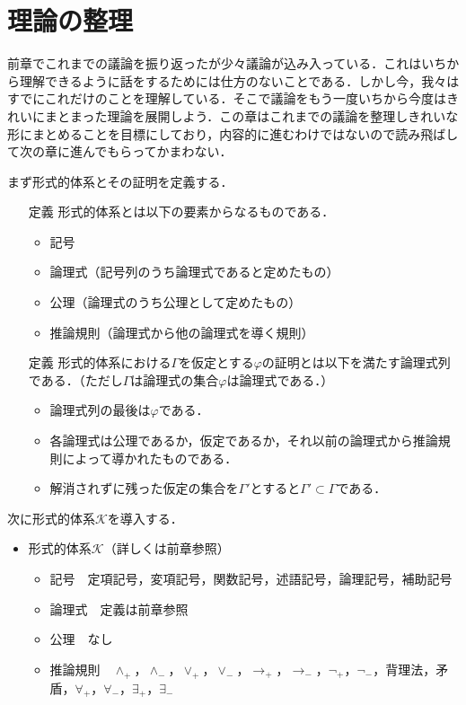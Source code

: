 \documentclass[10pt,b5paper,papersize,dvipdfmx]{jsbook}
\begin{document}
\section{理論の整理}
前章でこれまでの議論を振り返ったが少々議論が込み入っている．これはいちから理解できるように話をするためには仕方のないことである．しかし今，我々はすでにこれだけのことを理解している．そこで議論をもう一度いちから今度はきれいにまとまった理論を展開しよう．この章はこれまでの議論を整理しきれいな形にまとめることを目標にしており，内容的に進むわけではないので読み飛ばして次の章に進んでもらってかまわない．\par
まず形式的体系とその証明を定義する．
\begin{itemize}
\item[定義] 形式的体系とは以下の要素からなるものである．
\begin{itemize}
\item 記号
\item 論理式（記号列のうち論理式であると定めたもの）
\item 公理（論理式のうち公理として定めたもの）
\item 推論規則（論理式から他の論理式を導く規則）
\end{itemize}
\end{itemize}
\begin{itemize}
\item[定義] 形式的体系における$\Gamma$を仮定とする$\varphi$の証明とは以下を満たす論理式列である．（ただし$\Gamma$は論理式の集合$\varphi$は論理式である．）
\begin{itemize}
\item 論理式列の最後は$\varphi$である．
\item 各論理式は公理であるか，仮定であるか，それ以前の論理式から推論規則によって導かれたものである．
\item 解消されずに残った仮定の集合を$\Gamma'$とすると$\Gamma'\subset \Gamma$である．
\end{itemize}
\end{itemize}
次に形式的体系$\mathcal K$を導入する．
\begin{itemize}
\item 形式的体系$\mathcal K$（詳しくは前章参照）
\begin{itemize}
\item 記号　定項記号，変項記号，関数記号，述語記号，論理記号，補助記号
\item 論理式　定義は前章参照
\item 公理　なし
\item 推論規則　$\land_+， \land_-， \lor_+， \lor_-， \to_+， \to_-， \lnot_+， \lnot_-$，背理法，矛盾，$\forall_+， \forall_-， \exists_+， \exists_-$
\end{itemize}
\end{itemize}
\end{document}
